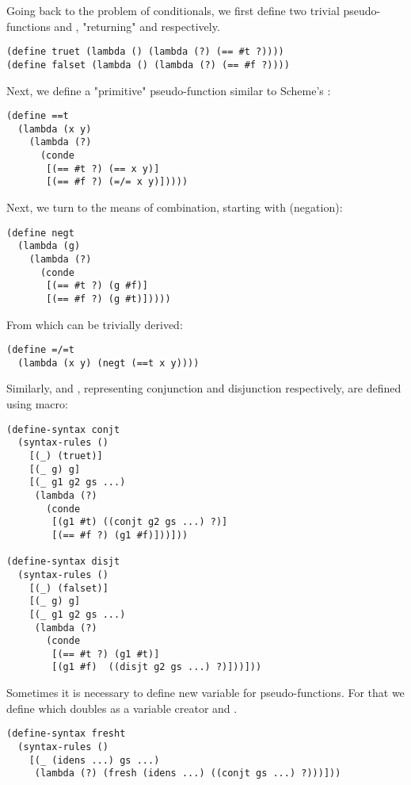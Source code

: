 Going back to the problem of conditionals, we first define two trivial pseudo-functions  and , "returning"  and  respectively.

\begin{lstlisting}
(define truet (lambda () (lambda (?) (== #t ?))))
(define falset (lambda () (lambda (?) (== #f ?))))
\end{lstlisting}

Next, we define a "primitive" pseudo-function similar to Scheme's :
\begin{lstlisting}
(define ==t
  (lambda (x y)
    (lambda (?)
      (conde
       [(== #t ?) (== x y)]
       [(== #f ?) (=/= x y)]))))
\end{lstlisting}

Next, we turn to the means of combination, starting with  (negation):
\begin{lstlisting}
(define negt
  (lambda (g)
    (lambda (?)
      (conde
       [(== #t ?) (g #f)]
       [(== #f ?) (g #t)]))))
\end{lstlisting}

From which  can be trivially derived:
\begin{lstlisting}
(define =/=t
  (lambda (x y) (negt (==t x y))))
\end{lstlisting}

Similarly,  and , representing conjunction and disjunction respectively, are defined using macro:
\begin{lstlisting}
(define-syntax conjt
  (syntax-rules ()
    [(_) (truet)]
    [(_ g) g]
    [(_ g1 g2 gs ...)
     (lambda (?)
       (conde
        [(g1 #t) ((conjt g2 gs ...) ?)]
        [(== #f ?) (g1 #f)]))]))

(define-syntax disjt
  (syntax-rules ()
    [(_) (falset)]
    [(_ g) g]
    [(_ g1 g2 gs ...)
     (lambda (?)
       (conde
        [(== #t ?) (g1 #t)]
        [(g1 #f)  ((disjt g2 gs ...) ?)]))]))
\end{lstlisting}

Sometimes it is necessary to define new variable for pseudo-functions. For that we define  which doubles as a variable creator and .
\begin{lstlisting}
(define-syntax fresht
  (syntax-rules ()
    [(_ (idens ...) gs ...)
     (lambda (?) (fresh (idens ...) ((conjt gs ...) ?)))]))
\end{lstlisting}

